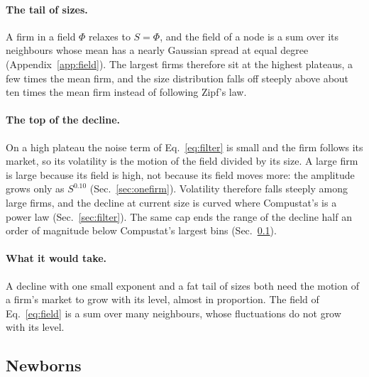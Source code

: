 \documentclass[pre,twocolumn,superscriptaddress,nofootinbib]{revtex4-2}
\begin{document}
\paragraph{The tail of sizes.}  A firm in a field $\Phi$ relaxes to $S=\Phi$, and the field of a node is a sum over
its neighbours whose mean has a nearly Gaussian spread at equal degree (Appendix~\ref{app:field}).  The largest firms
therefore sit at the highest plateaus, a few times the mean firm, and the size distribution falls off steeply above
about ten times the mean firm instead of following Zipf's law.

\paragraph{The top of the decline.}  On a high plateau the noise term of Eq.~\eqref{eq:filter} is small and the firm
follows its market, so its volatility is the motion of the field divided by its size.  A large firm is large because
its field is high, not because its field moves more: the amplitude grows only as $S^{0.10}$
(Sec.~\ref{sec:onefirm}).  Volatility therefore falls steeply among large firms, and the decline at current size is
curved where Compustat's is a power law (Sec.~\ref{sec:filter}).  The same cap ends the range of the decline half an
order of magnitude below Compustat's largest bins (Sec.~\ref{sec:range}).

\paragraph{What it would take.}  A decline with one small exponent and a fat tail of sizes both need the motion of a
firm's market to grow with its level, almost in proportion.  The field of Eq.~\eqref{eq:field} is a sum over many
neighbours, whose fluctuations do not grow with its level.

\subsection{Newborns}
\label{sec:range}
\end{document}
